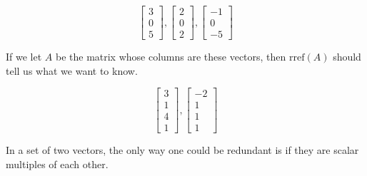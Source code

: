 \documentclass{ximera}
\begin{document}
\begin{problem}
\begin{problem}\label{prob:linindmultchoice3}
$$\begin{bmatrix}3\\0\\5\end{bmatrix}, \begin{bmatrix}2\\0\\2\end{bmatrix},\begin{bmatrix}-1\\0\\-5\end{bmatrix}$$

\begin{multipleChoice}
 \end{multipleChoice}
 \begin{hint}
 If we let $A$ be the matrix whose columns are these vectors, then $\mbox{rref}(A)$ should tell us what we want to know.
 \end{hint}
\end{problem}

\begin{problem}\label{prob:linindmultchoice4}
$$\begin{bmatrix}3\\1\\4\\1\end{bmatrix}, \begin{bmatrix}-2\\1\\1\\1\end{bmatrix}$$

\begin{multipleChoice}
 \end{multipleChoice}
 \begin{hint}
 In a set of two vectors, the only way one could be redundant is if they are scalar multiples of each other.
 \end{hint}

\end{problem}

\end{problem}
\end{document}
